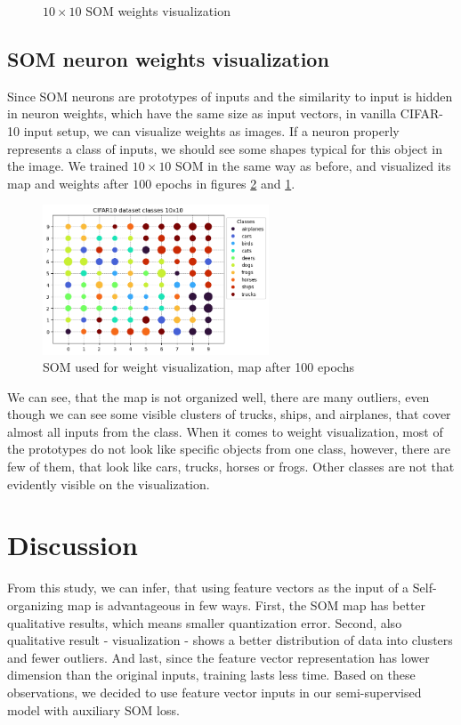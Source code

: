 \begin{figure}[h!]
    \centering
    
    \caption{$10 \times 10$ SOM weights visualization}
    \label{fig:som-weights}
\end{figure}


\subsection{SOM neuron weights visualization}
Since SOM neurons are prototypes of inputs and the similarity to input is hidden in neuron weights, which have the same size as input vectors, in vanilla CIFAR-10 input setup, we can visualize weights as images. If a neuron properly represents a class of inputs, we should see some shapes typical for this object in the image. We trained $10 \times 10$ SOM in the same way as before, and visualized its map and weights after $100$ epochs in figures \ref{fig:som-for-weights} and \ref{fig:som-weights}.

\begin{figure}[h!]
    \centering
    \includegraphics[width=0.6\textwidth]{figs/saved-cifar10-10n-99ep.png}
    \caption{SOM used for weight visualization, map after 100 epochs}
    \label{fig:som-for-weights}
\end{figure}


We can see, that the map is not organized well, there are many outliers, even though we can see some visible clusters of trucks, ships, and airplanes, that cover almost all inputs from the class. When it comes to weight visualization, most of the prototypes do not look like specific objects from one class, however, there are few of them, that look like cars, trucks, horses or frogs. Other classes are not that evidently visible on the visualization.



\section{Discussion}
From this study, we can infer, that using feature vectors as the input of a Self-organizing map is advantageous in few ways. First, the SOM map has better qualitative results, which means smaller quantization error. Second, also qualitative result - visualization - shows a better distribution of data into clusters and fewer outliers. And last, since the feature vector representation has lower dimension than the original inputs, training lasts less time. Based on these observations, we decided to use feature vector inputs in our semi-supervised model with auxiliary SOM loss.

